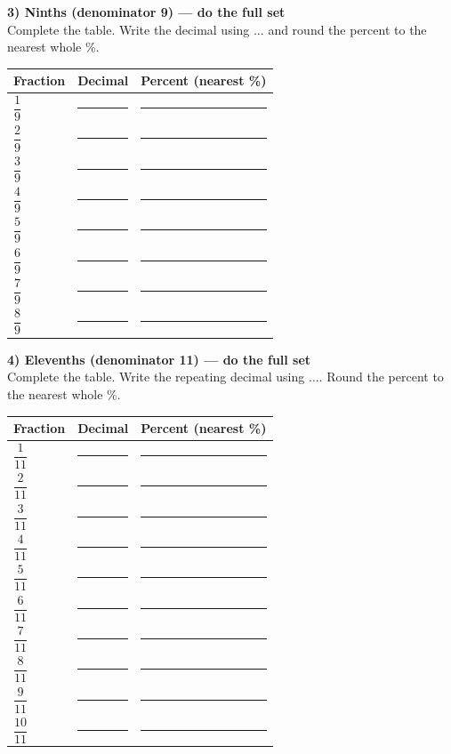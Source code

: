 \documentclass[12pt]{article}
\newcommand{\blank}{\rule{3.3cm}{0.4pt}}
\begin{document}
\vspace{6pt}
{\Large \textbf{3) Ninths (denominator 9) — do the full set}}\\
Complete the table. Write the decimal using \(\ldots\) and round the percent to the nearest whole \%.\\[-4pt]
\renewcommand{\arraystretch}{1.45}
\begin{tabular}{|>{\centering\arraybackslash}m{2.2cm}|>{\centering\arraybackslash}m{5.2cm}|>{\centering\arraybackslash}m{4.0cm}|}
\hline
\textbf{Fraction} & \textbf{Decimal} & \textbf{Percent (nearest \%)}\\
\hline
\(\dfrac{1}{9}\) & \blank & \blank\\ \hline
\(\dfrac{2}{9}\) & \blank & \blank\\ \hline
\(\dfrac{3}{9}\) & \blank & \blank\\ \hline
\(\dfrac{4}{9}\) & \blank & \blank\\ \hline
\(\dfrac{5}{9}\) & \blank & \blank\\ \hline
\(\dfrac{6}{9}\) & \blank & \blank\\ \hline
\(\dfrac{7}{9}\) & \blank & \blank\\ \hline
\(\dfrac{8}{9}\) & \blank & \blank\\ \hline
\end{tabular}

\vspace{6pt}
{\Large \textbf{4) Elevenths (denominator 11) — do the full set}}\\
Complete the table. Write the repeating decimal using \(\ldots\). Round the percent to the nearest whole \%.\\[-4pt]
\renewcommand{\arraystretch}{1.45}
\begin{tabular}{|>{\centering\arraybackslash}m{2.2cm}|>{\centering\arraybackslash}m{5.2cm}|>{\centering\arraybackslash}m{4.0cm}|}
\hline
\textbf{Fraction} & \textbf{Decimal} & \textbf{Percent (nearest \%)}\\
\hline
\(\dfrac{1}{11}\) & \blank & \blank\\ \hline
\(\dfrac{2}{11}\) & \blank & \blank\\ \hline
\(\dfrac{3}{11}\) & \blank & \blank\\ \hline
\(\dfrac{4}{11}\) & \blank & \blank\\ \hline
\(\dfrac{5}{11}\) & \blank & \blank\\ \hline
\(\dfrac{6}{11}\) & \blank & \blank\\ \hline
\(\dfrac{7}{11}\) & \blank & \blank\\ \hline
\(\dfrac{8}{11}\) & \blank & \blank\\ \hline
\(\dfrac{9}{11}\) & \blank & \blank\\ \hline
\(\dfrac{10}{11}\) & \blank & \blank\\ \hline
\end{tabular}
\end{document}
